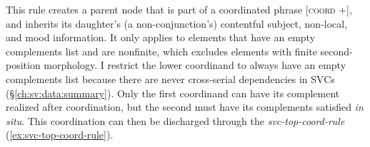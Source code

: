 This rule creates a parent node that is part of a coordinated phrase [\textsc{coord} +], and inherits its daughter's (a non-conjunction's) contentful subject, non-local, and mood information. It only applies to elements that have an empty complements list and are nonfinite, which excludes elements with finite second-position morphology. I restrict the lower coordinand to always have an empty complements list because there are never cross-serial dependencies in SVCs (\S\ref{ch:sv:data:summary}). Only the first coordinand can have its complement realized after coordination, but the second must have its complements satisfied \textit{in situ}. This coordination can then be discharged through the {\textit{svc-top-coord-rule}} (\ref{ex:svc-top-coord-rule}).

\begin{singlespacing}
\ex \label{ex:svc-top-coord-rule}
\xe
\end{singlespacing}

